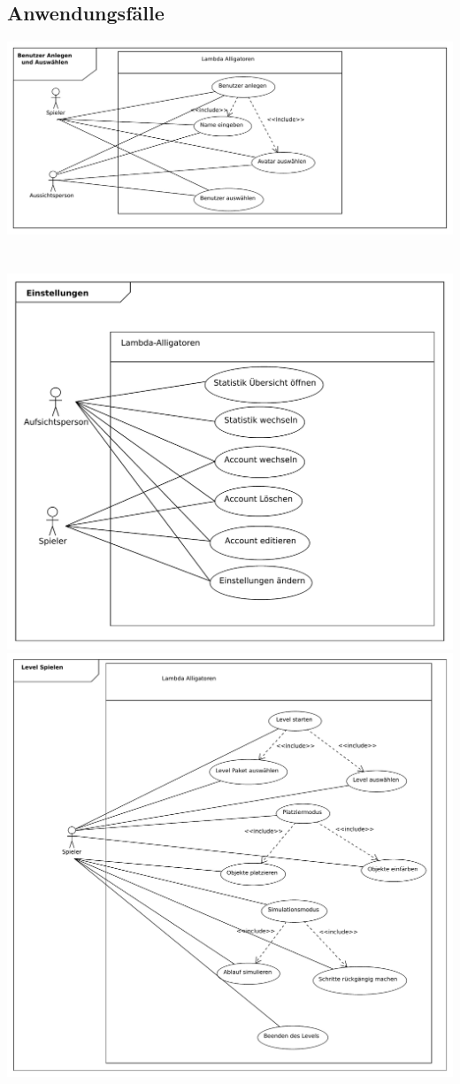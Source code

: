 \subsection{Anwendungsfälle}
\includegraphics[scale=0.6]{Systemmodelle/add_use_case.pdf}
\\
\\
\\
\includegraphics[scale=0.6]{Systemmodelle/settings_use_case.pdf}
\clearpage
\includegraphics[scale=0.6]{Systemmodelle/level_use_case.pdf}
